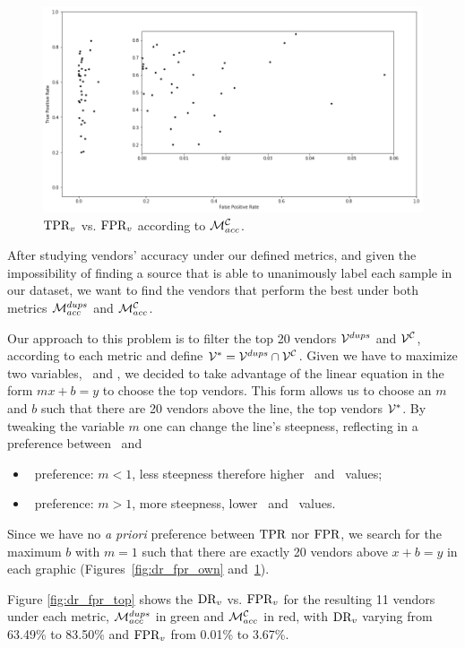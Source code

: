 \begin{figure}[!htb]
	\centering
	\includegraphics[width=\textwidth]{Figures/dr_fpr_d.png}
	\caption{$\textrm{TPR}_v$ vs. $\textrm{FPR}_v$ according to $\mathcal{M}_{acc}^{\mathcal{C}}$.}
	\label{fig:dr_fpr_d}
\end{figure}

After studying vendors' accuracy under our defined metrics, and given the impossibility of finding a source that is able to unanimously label each sample in our dataset, we want to find the vendors that perform the best under both metrics $\mathcal{M}_{acc}^{{dups}}$ and $\mathcal{M}_{acc}^{\mathcal{C}}$.

Our approach to this problem is to filter the top 20 vendors $\mathcal{V}^{{dups}}$ and $\mathcal{V}^{\mathcal{C}}$, according to each metric and define $\mathcal{V}^*=\mathcal{V}^{{dups}}\cap\mathcal{V}^{\mathcal{C}}$.
Given we have to maximize two variables, \tpr\ and \fpr, we decided to take advantage of the linear equation in the form $mx+b=y$ to choose the top vendors.
This form allows us to choose an $m$ and $b$ such that there are 20 vendors above the line, the top vendors $\mathcal{V}^*$.
By tweaking the variable $m$ one can change the line's steepness, reflecting in a preference between \tpr\ and \fpr\:

\begin{itemize}
	\item \tpr\ preference: $m < 1$, less steepness therefore higher \fpr\ and \tpr\ values;
	\item \fpr\ preference: $m > 1$, more steepness, lower \fpr\ and \tpr\ values.
\end{itemize}

Since we have no \emph{a priori} preference between $\textrm{TPR}$ nor $\textrm{FPR}$, we search for the maximum $b$ with $m=1$ such that there are exactly 20 vendors above $x+b=y$ in each graphic (Figures~\ref{fig:dr_fpr_own} and~\ref{fig:dr_fpr_d}).

Figure \ref{fig:dr_fpr_top} shows the $\textrm{DR}_v$ vs. $\textrm{FPR}_v$ for the resulting 11 vendors under each metric, $\mathcal{M}_{acc}^{{dups}}$ in green and $\mathcal{M}_{acc}^{\mathcal{C}}$ in red, with $\textrm{DR}_v$ varying from 63.49\% to 83.50\% and $\textrm{FPR}_v$ from 0.01\% to 3.67\%.

